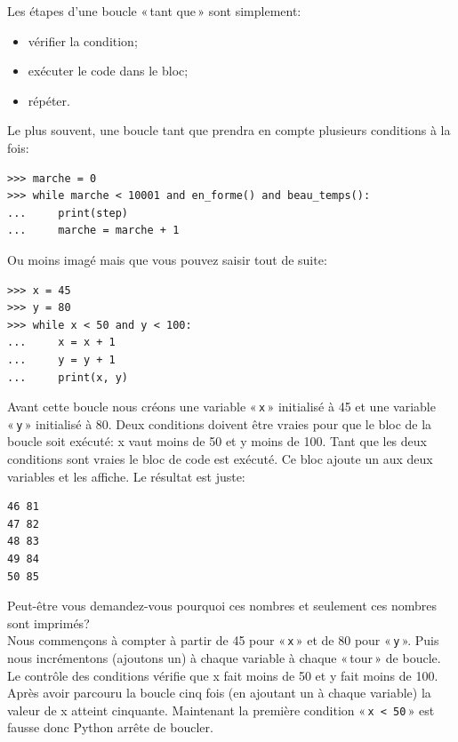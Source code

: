 Les étapes d'une boucle « tant que » sont simplement:
\begin{itemize}
\item vérifier la condition;
\item exécuter le code dans le bloc;
\item répéter.
\end{itemize}

Le plus souvent, une boucle tant que prendra en compte plusieurs conditions à la fois:

\begin{Verbatim}[frame=single,rulecolor=\color{gray}, label=ne pas saisir]
>>> marche = 0
>>> while marche < 10001 and en_forme() and beau_temps():
...     print(step)
...     marche = marche + 1 
\end{Verbatim}

Ou moins imagé mais que vous pouvez saisir tout de suite:

\begin{Verbatim}[frame=single,rulecolor=\color{mbleu}, label=à taper]
>>> x = 45
>>> y = 80
>>> while x < 50 and y < 100:
...     x = x + 1
...     y = y + 1
...     print(x, y)
\end{Verbatim}

Avant cette boucle nous créons une variable « \texttt{x} »  initialisé à 45 et une variable « \texttt{y} » initialisé à 80. Deux conditions doivent être vraies pour que le bloc de la boucle soit exécuté: x vaut moins de 50 et y moins de 100. Tant que les deux conditions sont vraies le bloc de code est exécuté. Ce bloc ajoute un aux deux variables et les affiche. Le résultat est juste:

\begin{Verbatim}[frame=single,rulecolor=\color{gray}, label=ne pas saisir]
46 81
47 82
48 83
49 84
50 85
\end{Verbatim}

Peut-être vous demandez-vous pourquoi ces nombres et seulement ces nombres sont imprimés?\\

Nous commençons à compter à partir de 45 pour « \texttt{x} »  et de 80 pour « \texttt{y} ». Puis nous incrémentons (ajoutons un) à chaque variable à chaque « tour » de boucle. Le contrôle des conditions vérifie que x fait moins de 50 et y fait moins de 100. Après avoir parcouru la boucle cinq fois (en ajoutant un à chaque variable) la valeur de x atteint cinquante. Maintenant la première condition « \texttt{x < 50} »  est fausse donc Python arrête de boucler.

